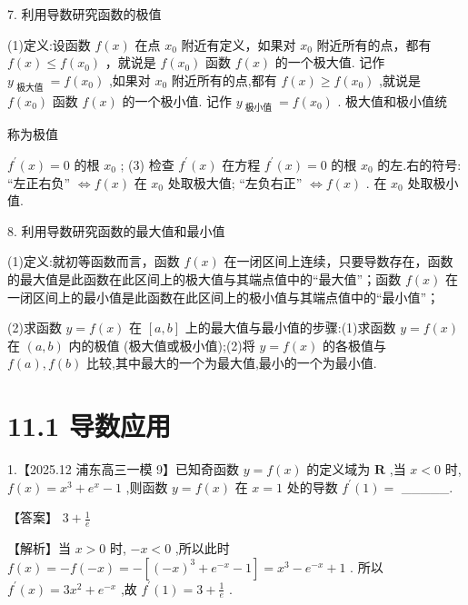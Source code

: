 \documentclass[10pt]{article}
\begin{document}
7. 利用导数研究函数的极值

(1)定义:设函数 \(f\left( x\right)\) 在点 \({x}_{0}\) 附近有定义，如果对 \({x}_{0}\) 附近所有的点，都有 \(f\left( x\right)  \leq  f\left( {x}_{0}\right)\) ，就说是 \(f\left( {x}_{0}\right)\) 函数 \(f\left( x\right)\) 的一个极大值. 记作 \({y}_{\text{ 极大值 }} = f\left( {x}_{0}\right)\) ,如果对 \({x}_{0}\) 附近所有的点,都有 \(f\left( x\right)  \geq  f\left( {x}_{0}\right)\) ,就说是 \(f\left( {x}_{0}\right)\) 函数 \(f\left( x\right)\) 的一个极小值. 记作 \({y}_{\text{ 极小值 }} = f\left( {x}_{0}\right)\) . 极大值和极小值统

称为极值

\({f}^{\prime }\left( x\right)  = 0\) 的根 \({x}_{0}\) ; (3) 检查 \({f}^{\prime }\left( x\right)\) 在方程 \({f}^{\prime }\left( x\right)  = 0\) 的根 \({x}_{0}\) 的左.右的符号: “左正右负” \(\Leftrightarrow  f\left( x\right)\) 在 \({x}_{0}\) 处取极大值; “左负右正” \(\Leftrightarrow  f\left( x\right)\) . 在 \({x}_{0}\) 处取极小值.

8. 利用导数研究函数的最大值和最小值

(1)定义:就初等函数而言，函数 \(f\left( x\right)\) 在一闭区间上连续，只要导数存在，函数的最大值是此函数在此区间上的极大值与其端点值中的“最大值”；函数 \(f\left( x\right)\) 在一闭区间上的最小值是此函数在此区间上的极小值与其端点值中的“最小值”；

(2)求函数 \(y = f\left( x\right)\) 在 \(\left\lbrack  {a,b}\right\rbrack\) 上的最大值与最小值的步骤:(1)求函数 \(y = f\left( x\right)\) 在 \(\left( {a,b}\right)\) 内的极值 (极大值或极小值);(2)将 \(y = f\left( x\right)\) 的各极值与 \(f\left( a\right) ,f\left( b\right)\) 比较,其中最大的一个为最大值,最小的一个为最小值.

\section*{11.1 导数应用}

1.【2025.12 浦东高三一模 9】已知奇函数 \(y = f\left( x\right)\) 的定义域为 \(\mathbf{R}\) ,当 \(x < 0\) 时, \(f\left( x\right)  = {x}^{3} + {e}^{x} - 1\) ,则函数 \(y = f\left( x\right)\) 在 \(x = 1\) 处的导数 \({f}^{\prime }\left( 1\right)  =\) \_\_\_\_\_.

【答案】 \(3 + \frac{1}{e}\)

【解析】当 \(x > 0\) 时, \(- x < 0\) ,所以此时 \(f\left( x\right)  =  - f\left( {-x}\right)  =  - \left\lbrack  {{\left( -x\right) }^{3} + {e}^{-x} - 1}\right\rbrack   = {x}^{3} - {e}^{-x} + 1\) . 所以 \({f}^{\prime }\left( x\right)  = 3{x}^{2} + {e}^{-x}\) ,故 \({f}^{\prime }\left( 1\right)  = 3 + \frac{1}{e}\) .
\end{document}
